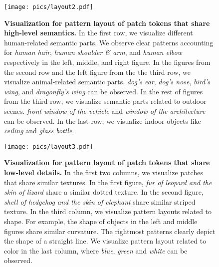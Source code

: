 \documentclass{article} \usepackage{iclr2022_conference,times}
\begin{document}
\begin{figure}[!t]
\centering
\texttt{[image: pics/layout2.pdf]}
\vspace{-0.6cm}
\caption{\textbf{Visualization for pattern layout of patch tokens that share high-level semantics.} In the first row, we visualize different human-related semantic parts. We observe clear patterns accounting for \textit{human hair}, \textit{human shoulder \& arm}, and \textit{human elbow} respectively in the left, middle, and right figure. In the figures from the second row and the left figure from the the third row, we visualize animal-related semantic parts. \textit{dog's ear}, \textit{dog's nose}, \textit{bird's wing}, and \textit{dragonfly's wing} can be observed. In the rest of figures from the third row, we visualize semantic parts related to outdoor scenes. \textit{front window of the vehicle} and \textit{window of the architecture} can be observed. In the last row, we visualize indoor objects like \textit{ceiling} and \textit{glass bottle}. 
}
\vspace{-0.2cm}
\label{fig:layout2}
\end{figure}

\begin{figure}[!t]
\centering
\texttt{[image: pics/layout3.pdf]}
\vspace{-0.2cm}
\caption{\textbf{Visualization for pattern layout of patch tokens that share low-level details.} In the first two columns, we visualize patches that share similar textures. 
In the first figure, \textit{fur of leopard and the skin of lizard} share a similar dotted texture. 
In the second figure, \textit{shell of hedgehog and the skin of elephant} share similar striped texture. 
In the third column, we visualize pattern layouts related to shape. For example, the shape of objects in the left and middle figures share similar curvature. The rightmost patterns clearly depict the shape of a straight line. 
We visualize pattern layout related to color in the last column, where \textit{blue}, \textit{green} and \textit{white} can be observed.}
\vspace{-0.2cm}
\label{fig:layout3}
\end{figure}
\end{document}
